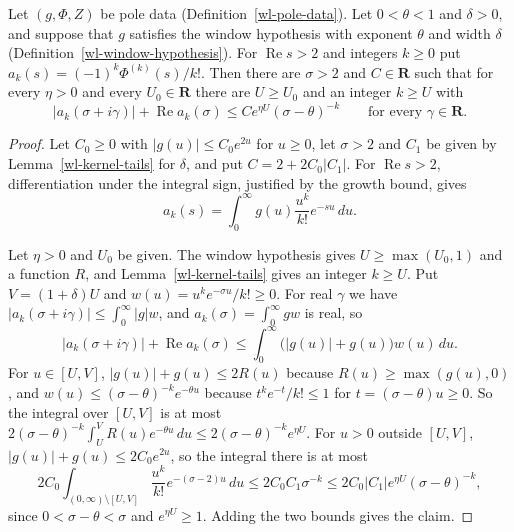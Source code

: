 \begin{lemma}\label{wl-coefficient-bound}
Let $(g,\Phi,Z)$ be pole data (Definition~\ref{wl-pole-data}). Let
$0<\theta<1$ and $\delta>0$, and suppose that $g$ satisfies the window
hypothesis with exponent $\theta$ and width $\delta$
(Definition~\ref{wl-window-hypothesis}). For $\operatorname{Re}s>2$ and
integers $k\geq0$ put $a_k(s)=(-1)^k\Phi^{(k)}(s)/k!$. Then there are
$\sigma>2$ and $C\in\mathbf R$ such that for every $\eta>0$ and every
$U_0\in\mathbf R$ there are $U\geq U_0$ and an integer $k\geq U$ with
\[
 |a_k(\sigma+i\gamma)|+\operatorname{Re}a_k(\sigma)\leq Ce^{\eta U}(\sigma-\theta)^{-k}
 \qquad\text{for every }\gamma\in\mathbf R.
\]
\end{lemma}
\begin{proof}
Let $C_0\geq0$ with $|g(u)|\leq C_0e^{2u}$ for $u\geq0$, let $\sigma>2$ and
$C_1$ be given by Lemma~\ref{wl-kernel-tails} for $\delta$, and put
$C=2+2C_0|C_1|$. For $\operatorname{Re}s>2$, differentiation under the
integral sign, justified by the growth bound, gives
\[
 a_k(s)=\int_0^\infty g(u)\frac{u^k}{k!}e^{-su}\,du.
\]

Let $\eta>0$ and $U_0$ be given. The window hypothesis gives
$U\geq\max(U_0,1)$ and a function $R$, and Lemma~\ref{wl-kernel-tails} gives
an integer $k\geq U$. Put $V=(1+\delta)U$ and
$w(u)=u^ke^{-\sigma u}/k!\geq0$. For real $\gamma$ we have
$|a_k(\sigma+i\gamma)|\leq\int_0^\infty|g|w$, and $a_k(\sigma)=\int_0^\infty gw$
is real, so
\[
 |a_k(\sigma+i\gamma)|+\operatorname{Re}a_k(\sigma)
 \leq\int_0^\infty\bigl(|g(u)|+g(u)\bigr)w(u)\,du.
\]
For $u\in[U,V]$, $|g(u)|+g(u)\leq2R(u)$ because $R(u)\geq\max(g(u),0)$, and
$w(u)\leq(\sigma-\theta)^{-k}e^{-\theta u}$ because $t^ke^{-t}/k!\leq1$ for
$t=(\sigma-\theta)u\geq0$. So the integral over $[U,V]$ is at most
$2(\sigma-\theta)^{-k}\int_U^VR(u)e^{-\theta u}\,du\leq2(\sigma-\theta)^{-k}e^{\eta U}$.
For $u>0$ outside $[U,V]$, $|g(u)|+g(u)\leq2C_0e^{2u}$, so the integral there
is at most
\[
 2C_0\int_{(0,\infty)\setminus[U,V]}\frac{u^k}{k!}e^{-(\sigma-2)u}\,du
 \leq2C_0C_1\sigma^{-k}\leq2C_0|C_1|e^{\eta U}(\sigma-\theta)^{-k},
\]
since $0<\sigma-\theta<\sigma$ and $e^{\eta U}\geq1$. Adding the two bounds
gives the claim.
\end{proof}


